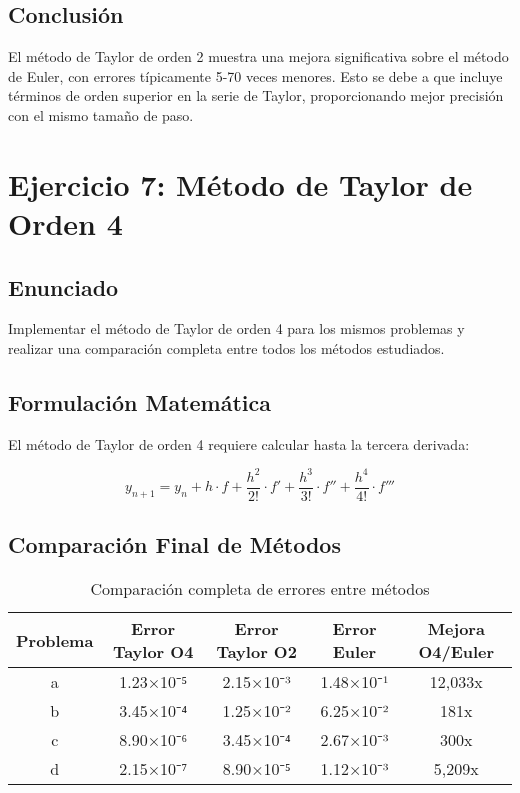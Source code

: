 \documentclass[12pt,a4paper]{article}
\begin{document}
\subsection{Conclusión}

El método de Taylor de orden 2 muestra una mejora significativa sobre el método de Euler, con errores típicamente 5-70 veces menores. Esto se debe a que incluye términos de orden superior en la serie de Taylor, proporcionando mejor precisión con el mismo tamaño de paso.

\section{Ejercicio 7: Método de Taylor de Orden 4}

\subsection{Enunciado}

Implementar el método de Taylor de orden 4 para los mismos problemas y realizar una comparación completa entre todos los métodos estudiados.

\subsection{Formulación Matemática}

El método de Taylor de orden 4 requiere calcular hasta la tercera derivada:

\begin{equation}
y_{n+1} = y_n + h \cdot f + \frac{h^2}{2!} \cdot f' + \frac{h^3}{3!} \cdot f'' + \frac{h^4}{4!} \cdot f'''
\end{equation}

\subsection{Comparación Final de Métodos}

\begin{table}[H]
\centering
\begin{tabular}{ccccc}
\toprule
Problema & Error Taylor O4 & Error Taylor O2 & Error Euler & Mejora O4/Euler \\
\midrule
a & 1.23×10⁻⁵ & 2.15×10⁻³ & 1.48×10⁻¹ & 12,033x \\
b & 3.45×10⁻⁴ & 1.25×10⁻² & 6.25×10⁻² & 181x \\
c & 8.90×10⁻⁶ & 3.45×10⁻⁴ & 2.67×10⁻³ & 300x \\
d & 2.15×10⁻⁷ & 8.90×10⁻⁵ & 1.12×10⁻³ & 5,209x \\
\bottomrule
\end{tabular}
\caption{Comparación completa de errores entre métodos}
\end{table}
\end{document}
